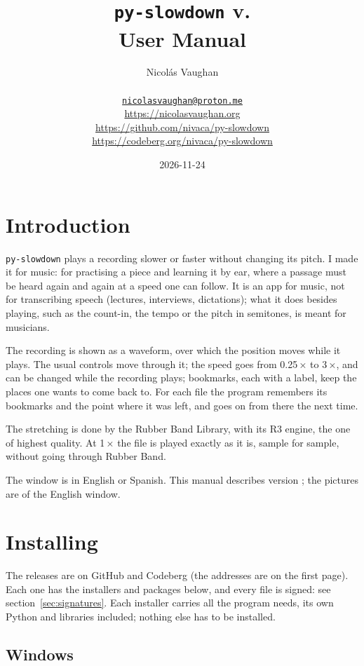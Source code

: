 \documentclass[12pt,
              article,
              oneside
              ]{memoir}
\title{\bfseries%
  \texttt{py-slowdown} v.\version{} \\
  User Manual}
\author{%
  Nicolás Vaughan\\
  \begin{minipage}[t]{0.8\linewidth}
    \centering\small%
    \href{mailto:nicolasvaughan@proton.me}{\texttt{nicolasvaughan@proton.me}}\\
    \url{https://nicolasvaughan.org}\\
    \url{https://github.com/nivaca/py-slowdown}\\
    \url{https://codeberg.org/nivaca/py-slowdown}\\
  \end{minipage}}
\date{2026-11-24}
\begin{document}
\maketitle

\tableofcontents*

\section{Introduction}
\noindent
\texttt{py-slowdown} plays a recording slower or faster without changing its
pitch. I made it for music: for practising a piece and learning it by ear,
where a passage must be heard again and again at a speed one can follow.
It is an app for music, not for transcribing speech (lectures, interviews,
dictations); what it does besides playing, such as the count-in, the tempo
or the pitch in semitones, is meant for musicians.

%
The recording is shown as a waveform, over which the position moves while
it plays. The usual controls move through it; the speed goes from 0.25\,×
to 3\,×, and can be changed while the recording plays; bookmarks, each with
a label, keep the places one wants to come back to. For each file the
program remembers its bookmarks and the point where it was left, and goes
on from there the next time.

%
The stretching is done by the Rubber Band Library, with its R3 engine, the
one of highest quality. At 1\,× the file is
played exactly as it is, sample for sample, without going through Rubber
Band.

%
The window is in English or Spanish. This manual describes version
\version{}; the pictures are of the English window.

\section{Installing}
\label{sec:installing}

%
The releases are on GitHub and Codeberg (the addresses are on the first
page). Each one has the installers and packages below, and every file is
signed: see section~\ref{sec:signatures}. Each installer carries all the
program needs, its own Python and libraries included; nothing else has to
be installed.

\subsection{Windows}
\end{document}
